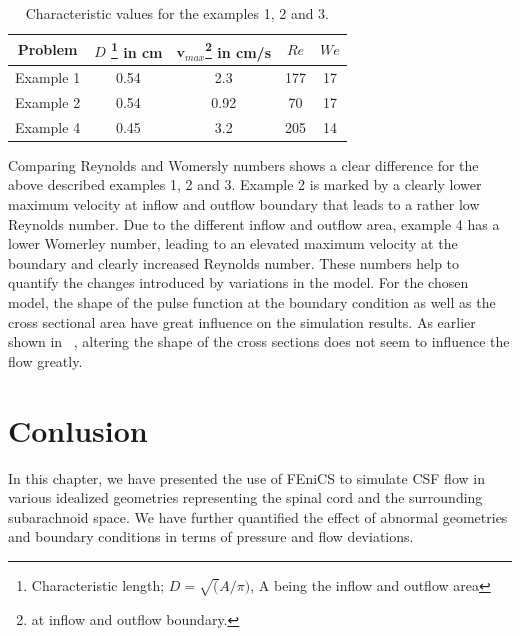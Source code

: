 \begin{table}\begin{center}
    \begin{tabular}{ | c | c | c | c | c |}
    \hline
    Problem & $D$ \footnote{Characteristic length; $D=\sqrt(A/\pi)$, A being the inflow and outflow area} in cm & $\mathbf{v}_{max}$\footnote{at inflow and outflow boundary.} in cm/s  & $Re$ & $We$ \\ \hline\hline
	Example 1 	&	0.54 & 2.3 & 177 & 17	\\ \hline
	Example 2	&	0.54 & 0.92 & 70 & 17	\\ \hline
	Example 4	&	0.45 & 3.2 	& 205 & 14	\\ \hline
    \end{tabular}
	\label{tab:Re_We}
	\caption{Characteristic values for the examples 1, 2 and 3.}
\end{center}\end{table}

Comparing Reynolds and Womersly numbers shows a clear difference for
the above described examples 1, 2 and 3. Example 2 is marked by a
clearly lower maximum velocity at inflow and outflow boundary that
leads to a rather low Reynolds number. Due to the different inflow and
outflow area, example 4 has a lower Womerley number, leading to an
elevated maximum velocity at the boundary and clearly increased
Reynolds number. These numbers help to quantify the changes
introduced by variations in the model. For the chosen model, the shape
of the pulse function at the boundary condition as well as the cross
sectional area have great influence on the simulation results. As
earlier shown in ~\cite{Lopes2007}, altering the shape of
the cross sections does not seem to influence the flow greatly.


\section{Conlusion}
In this chapter, we have presented the use of FEniCS to simulate CSF flow in various idealized geometries representing the
spinal cord and the surrounding subarachnoid space. We have further 
quantified the effect of abnormal geometries and boundary conditions 
in terms of pressure and flow deviations.  

